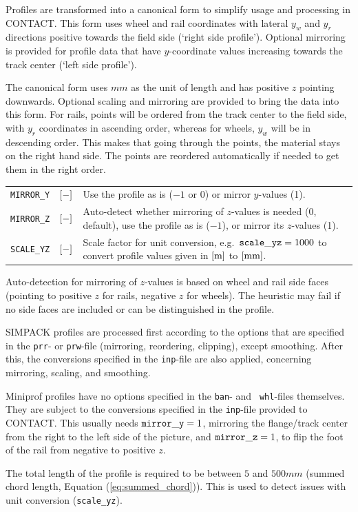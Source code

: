\documentclass[12pt]{report}
\newenvironment{inputvars}{\vspace{0.4\baselineskip}%

\begin{tabular}{>{\raggedright}p{22mm}p{19mm}p{113mm}}}{
\end{tabular}

}
\newcommand{\inpvar}[3]{{\small\tt #1} & $#2$ & #3 \\[1ex]}
\begin{document}
Profiles are transformed into a canonical form to simplify usage and
processing in CONTACT. This form uses wheel and rail coordinates with lateral
$y_w$ and $y_r$ directions positive towards the field side (`right side
profile'). Optional mirroring is provided for profile data that have
$y$-coordinate values increasing towards the track center (`left side
profile').

The canonical form uses $\unit{mm}$ as the unit of length and has positive
$z$ pointing downwards. Optional scaling and mirroring are provided to
bring the data into this form. For rails, points will be ordered from the
track center to the field side, with $y_r$ coordinates in ascending order,
whereas for wheels, $y_w$ will be in descending order. This makes that going
through the points, the material stays on the right hand side.
The points are reordered automatically if needed to get them in the right
order.
\begin{inputvars}
\inpvar{MIRROR\_Y}{\bunit{-}}{Use the profile as is ($-1$ or $0$) or mirror
        $y$-values (1).}
\inpvar{MIRROR\_Z}{\bunit{-}}{Auto-detect whether mirroring of $z$-values is
        needed (0, default), use the profile as is ($-1$), or mirror its
        $z$-values (1).}
\inpvar{SCALE\_YZ}{\bunit{-}}{Scale factor for unit conversion, e.g.\ 
        ${\tt scale\_yz}=1000$ to convert profile values given in $[\mathrm{m}]$
        to $[\mathrm{mm}]$.} 
\end{inputvars}
Auto-detection for mirroring of $z$-values is based on wheel and rail side
faces (pointing to positive $z$ for rails, negative $z$ for wheels). The
heuristic may fail if no side faces are included or can be distinguished
in the profile.

SIMPACK profiles are processed first according to the options that are
specified in the {\tt prr}- or {\tt prw}-file (mirroring, reordering,
clipping), except smoothing. After this, the conversions specified in the
{\tt inp}-file are also applied, concerning mirroring, scaling, and
smoothing. 

Miniprof profiles have no options specified in the {\tt ban}- and {\tt 
whl}-files themselves. They are subject to the conversions specified in
the {\tt inp}-file provided to CONTACT. This usually needs ${\tt mirror\_y}
=1$, mirroring the flange/track center from the right to the left side of
the picture, and ${\tt mirror\_z}=1$, to flip the foot of the rail from
negative to positive $z$.

The total length of the profile is required to be between $5$ and
$500\unit{mm}$ (summed chord length, Equation (\ref{eq:summed_chord})).
This is used to detect issues with unit conversion ({\tt scale\_yz}).
\end{document}
